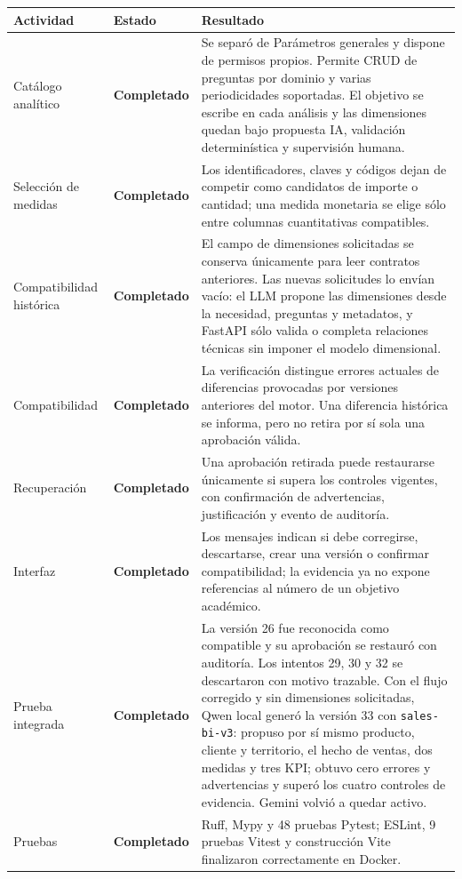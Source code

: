 \documentclass[11pt,letterpaper]{article}
\newcommand{\statusok}{\textcolor{deepgreen}{\textbf{Completado}}}
\newcommand{\file}[1]{\texttt{#1}}
\begin{document}
\begin{longtable}{@{}p{}p{}p{}@{}}
  \toprule
  \textbf{Actividad} & \textbf{Estado} & \textbf{Resultado} \\
  \midrule
  Catálogo analítico & \statusok & Se separó de Parámetros generales y dispone de permisos propios. Permite CRUD de preguntas por dominio y varias periodicidades soportadas. El objetivo se escribe en cada análisis y las dimensiones quedan bajo propuesta IA, validación determinística y supervisión humana. \\
  Selección de medidas & \statusok & Los identificadores, claves y códigos dejan de competir como candidatos de importe o cantidad; una medida monetaria se elige sólo entre columnas cuantitativas compatibles. \\
  Compatibilidad histórica & \statusok & El campo de dimensiones solicitadas se conserva únicamente para leer contratos anteriores. Las nuevas solicitudes lo envían vacío: el LLM propone las dimensiones desde la necesidad, preguntas y metadatos, y FastAPI sólo valida o completa relaciones técnicas sin imponer el modelo dimensional. \\
  Compatibilidad & \statusok & La verificación distingue errores actuales de diferencias provocadas por versiones anteriores del motor. Una diferencia histórica se informa, pero no retira por sí sola una aprobación válida. \\
  Recuperación & \statusok & Una aprobación retirada puede restaurarse únicamente si supera los controles vigentes, con confirmación de advertencias, justificación y evento de auditoría. \\
  Interfaz & \statusok & Los mensajes indican si debe corregirse, descartarse, crear una versión o confirmar compatibilidad; la evidencia ya no expone referencias al número de un objetivo académico. \\
  Prueba integrada & \statusok & La versión 26 fue reconocida como compatible y su aprobación se restauró con auditoría. Los intentos 29, 30 y 32 se descartaron con motivo trazable. Con el flujo corregido y sin dimensiones solicitadas, Qwen local generó la versión 33 con \file{sales-bi-v3}: propuso por sí mismo producto, cliente y territorio, el hecho de ventas, dos medidas y tres KPI; obtuvo cero errores y advertencias y superó los cuatro controles de evidencia. Gemini volvió a quedar activo. \\
  Pruebas & \statusok & Ruff, Mypy y 48 pruebas Pytest; ESLint, 9 pruebas Vitest y construcción Vite finalizaron correctamente en Docker. \\
  \bottomrule
\end{longtable}
\end{document}
